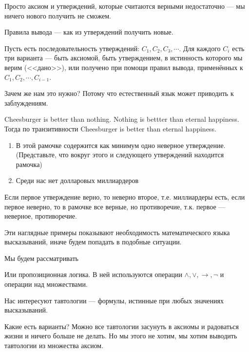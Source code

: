 Просто аксиом и утверждений, которые считаются верными недостаточно --- мы ничего нового получить не сможем.

\begin{definition}
Правила вывода --- как из утверждений получить новые.

Пусть есть последовательность утверждений: $C_1, C_2, C_3, \cdots$. Для каждого $C_i$ есть три варианта --- быть аксиомой, быть утверждением, в истинность которого мы верим (<<дано>>), или получено при помощи правил вывода, применённых к $C_1, C_2, \cdots, C_{i-1}$. 

\end{definition}

Зачем же нам это нужно? Потому что естественный язык может приводить к заблуждениям.

\begin{example}
	Cheesburger is better than nothing. Nothing is bettter than eternal happiness. Тогда по транзитивности Cheesburger is better than eternal happiness.
\end{example}

\begin{example}
	\begin{enumerate}
		\item{В этой рамочке содержится как минимум одно неверное утверждение. (Представьте, что вокруг этого и следующего утверждений находится рамочка)}
		\item{Среди нас нет долларовых миллиардеров}

	\end{enumerate}
	Если первое утверждение верно, то неверно второе, т.е. миллиардеры есть, если первое неверно, то в рамочке все верные, но противоречие, т.к. первое --- неверное, противоречие.
\end{example}

Эти наглядные примеры показывают необходимость математического языка высказываний, иначе будем попадать в подобные ситуации.

Мы будем рассматривать


Или пропозиционная логика. В ней используются операции $\land, \lor, \to, \lnot$ и операции над множествами.

Нас интересуют тавтологии --- формулы, истинные при любых значениях высказываний.

Какие есть варианты? Можно все тавтологии засунуть в аксиомы и радоваться жизни и ничего больше не делать. Но мы этого не хотим, мы хотим выводить тавтологии из множества аксиом.

